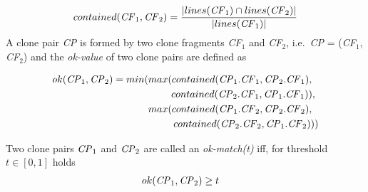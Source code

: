 \documentclass[10pt,journal,compsoc]{IEEEtran}
\newcommand{\squeezeup}{\vspace{-0.5mm}}
\begin{document}
\begin{displaymath}
contained(\textrm{\textit{CF}}_1, \textrm{\textit{CF}}_2) = \frac{|lines(\textrm{\textit{CF}}_1) \cap lines(\textrm{\textit{CF}}_2)|}{|lines(\textrm{\textit{CF}}_1)|}
\end{displaymath}
\noindent%
A clone pair \textit{CP} is formed by two clone fragments
\textit{CF$_1$} and \textit{CF$_2$}, i.e.~\textit{CP} =
(\textit{CF$_1$}, \textit{CF$_2$})
and the \textit{ok-value} of two clone pairs are defined as

\begin{align*}
ok(\textrm{\textit{CP}}_1,\textrm{\textit{CP}}_2) = min(max(contained(\textrm{\textit{CP}}_1.\textrm{\textit{CF}}_1,\textrm{\textit{CP}}_2.\textrm{\textit{CF}}_1),~~ \\ contained(\textrm{\textit{CP}}_2.\textrm{\textit{CF}}_1,\textrm{\textit{CP}}_1.\textrm{\textit{CF}}_1)),~
\\ max(contained(\textrm{\textit{CP}}_1.\textrm{\textit{CF}}_2,\textrm{\textit{CP}}_2.\textrm{\textit{CF}}_2),~~ \\contained(\textrm{\textit{CP}}_2.\textrm{\textit{CF}}_2,\textrm{\textit{CP}}_1.\textrm{\textit{CF}}_2)))
\end{align*}

\noindent%
Two clone pairs $\textrm{\textit{CP}}_1$ and $\textrm{\textit{CP}}_2$
are called an \textit{ok-match(t)}  iff, for threshold $t \in [0,1]$ holds 
\begin{align*}
ok(\textrm{\textit{CP}}_1,\textrm{\textit{CP}}_2) & \geq t
\end{align*}
\end{document}

